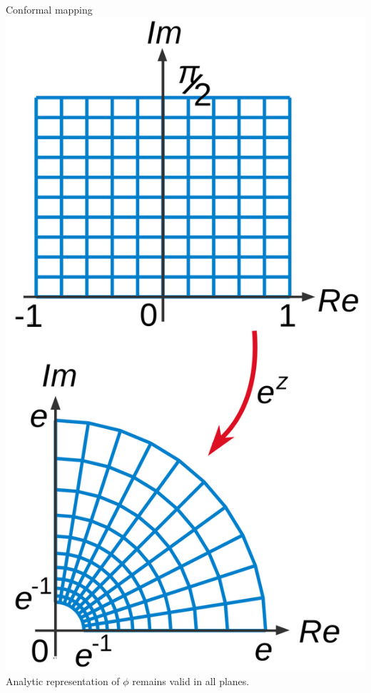 \documentclass{sintefbeamer}
\renewcommand{\_}[1]{_\mr{#1}}
\begin{document}
\begin{frame}{Conformal mapping}
	\includegraphics[width=.22\framewidth]{1200px-Biholomorphism_illustration.svg.png}\\
	
	Analytic representation of $\phi$ remains valid in all planes.
\end{frame}

\end{document}

